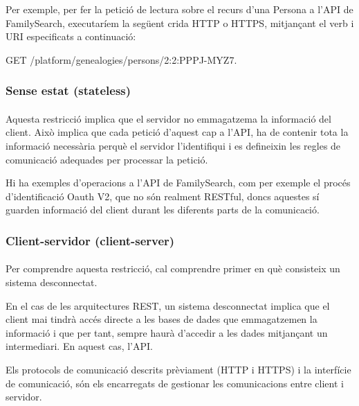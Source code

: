     Per exemple, per fer la petició de lectura sobre el recurs d’una Persona a l’\gls{API} de FamilySearch, executaríem la següent crida \gls{HTTP} o \gls{HTTPS}, mitjançant el verb i URI especificats a continuació:
    \begin{displayquote}
        GET /platform/genealogies/persons/2:2:PPPJ-MYZ7.
    \end{displayquote}


    \subsubsection{Sense estat (stateless)}

    \paragraph{}
    Aquesta restricció implica que el servidor no emmagatzema la informació del client. Això implica que cada petició d'aquest cap a l’\gls{API}, ha de contenir tota la informació necessària perquè el servidor l'identifiqui i es defineixin les regles de comunicació adequades per processar la petició.

    Hi ha exemples d'operacions a l'\gls{API} de FamilySearch, com per exemple el procés d'identificació Oauth V2, que no són realment RESTful, doncs aquestes sí guarden informació del client durant les diferents parts de la comunicació.


    \subsubsection{Client-servidor (client-server)}

    \paragraph{}
    Per comprendre aquesta restricció, cal comprendre primer en què consisteix un sistema desconnectat.

    En el cas de les arquitectures REST, un sistema desconnectat implica que el client mai tindrà accés directe a les bases de dades que emmagatzemen la informació i que per tant, sempre haurà d'accedir a les dades mitjançant un intermediari. En aquest cas, l'\gls{API}.

    Els protocols de comunicació descrits prèviament (\gls{HTTP} i \gls{HTTPS}) i la interfície de comunicació, són els encarregats de gestionar les comunicacions entre client i servidor.


